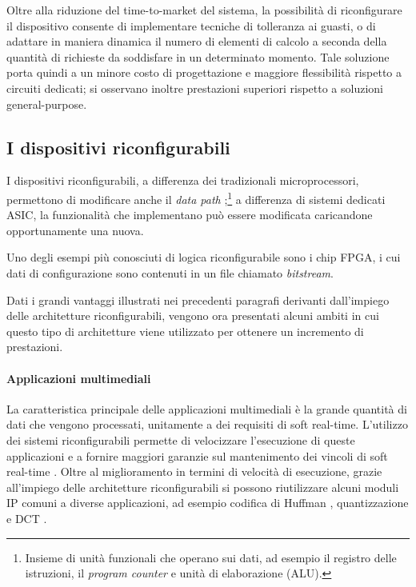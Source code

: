 Oltre alla riduzione del time-to-market del sistema, la possibilit\`a di riconfigurare
il dispositivo consente di implementare tecniche di tolleranza ai guasti, o di adattare
in maniera dinamica il numero di elementi di calcolo a seconda della quantit\`a di richieste
da soddisfare in un determinato momento. Tale soluzione porta quindi a un minore costo di progettazione
e maggiore flessibilità rispetto a circuiti dedicati; si osservano inoltre prestazioni superiori
rispetto a soluzioni general-purpose.



\subsection{I dispositivi riconfigurabili}
I dispositivi riconfigurabili, a differenza dei tradizionali microprocessori, permettono di modificare
anche il \emph{data path} \cite{ReconfigurableDatapath};\footnote{Insieme di unit\`a funzionali che operano sui dati, ad esempio il
registro delle istruzioni, il \emph{program counter} e unit\`a di elaborazione (\acs{ALU}).}
a differenza di sistemi dedicati \ac{ASIC}, la funzionalit\`a che implementano pu\`o essere
modificata caricandone opportunamente una nuova.

Uno degli esempi pi\`u conosciuti di logica riconfigurabile sono i chip \ac{FPGA}, i cui dati di
configurazione sono contenuti in un file chiamato \emph{bitstream}.


Dati i grandi vantaggi illustrati nei precedenti paragrafi derivanti dall'impiego delle
architetture riconfigurabili, vengono ora presentati alcuni ambiti in cui questo tipo
di architetture viene utilizzato per ottenere un incremento di prestazioni.

\paragraph{Applicazioni multimediali}
La caratteristica principale delle applicazioni multimediali è la grande quantità di dati che
vengono processati, unitamente a dei requisiti di soft real-time. L'utilizzo dei sistemi
riconfigurabili permette di velocizzare l'esecuzione di queste applicazioni e a fornire maggiori garanzie
sul mantenimento dei vincoli di soft real-time \cite{ReconfigurableSystemDesignVerification}. Oltre al miglioramento
in termini di velocità di esecuzione, grazie all'impiego delle architetture riconfigurabili si possono
riutilizzare alcuni moduli \ac{IP} comuni a diverse applicazioni, ad esempio codifica di
Huffman \cite{HuffmanFPGA}, quantizzazione e \ac{DCT} \cite{DCTImplementation}.

